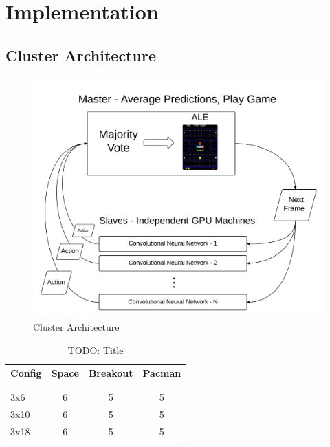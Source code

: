 \documentclass{article} %
\begin{document}
\section{Implementation}

\subsection{Cluster Architecture}

\begin{figure}[H]
\begin{center}
\includegraphics[width=1.0\textwidth]{arch}
\end{center}
\caption{Cluster Architecture}
\end{figure}


\begin{table}[H]
\caption{TODO: Title}
\label{sample-table}
\begin{center}
    \begin{tabular}{l | ccc}
        {\bf Config} & \multicolumn{1}{c}{\bf Space}  & \multicolumn{1}{c}{\bf Breakout} & \multicolumn{1}{c}{\bf Pacman} \\
        \\ \hline \\
        3x6     &6 &5 &5 \\
        3x10    &6 &5 &5 \\
        3x18    &6 &5 &5 \\
    \end{tabular}
\end{center}
\end{table}
\end{document}
